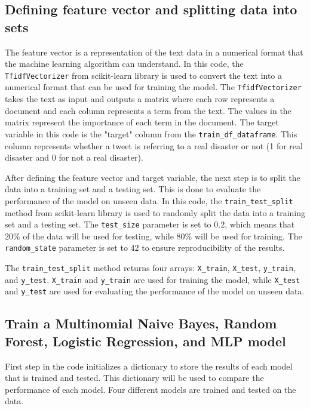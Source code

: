 \documentclass[11pt]{diazessay} %
\begin{document}
\subsection{Defining feature vector and splitting data into sets}

The feature vector is a representation of the text data in a numerical format that the machine learning algorithm can understand. In this code, the \verb|TfidfVectorizer| from scikit-learn library is used to convert the text into a numerical format that can be used for training the model. The \verb|TfidfVectorizer| takes the text as input and outputs a matrix where each row represents a document and each column represents a term from the text. The values in the matrix represent the importance of each term in the document. The target variable in this code is the "target" column from the \verb|train_df_dataframe|. This column represents whether a tweet is referring to a real disaster or not (1 for real disaster and 0 for not a real disaster).

After defining the feature vector and target variable, the next step is to split the data into a training set and a testing set. This is done to evaluate the performance of the model on unseen data. In this code, the \verb|train_test_split| method from scikit-learn library is used to randomly split the data into a training set and a testing set. The \verb|test_size| parameter is set to 0.2, which means that 20\% of the data will be used for testing, while 80\% will be used for training. The \verb|random_state| parameter is set to 42 to ensure reproducibility of the results.

The \verb|train_test_split| method returns four arrays: \verb|X_train|, \verb|X_test|, \verb|y_train|, and \verb|y_test|. \verb|X_train| and \verb|y_train| are used for training the model, while \verb|X_test| and \verb|y_test| are used for evaluating the performance of the model on unseen data.

\subsection{Train a Multinomial Naive Bayes, Random Forest, Logistic Regression, and MLP model}

First step in the code initializes a dictionary to store the results of each model that is trained and tested. This dictionary will be used to compare the performance of each model. Four different models are trained and tested on the data.
\end{document}
